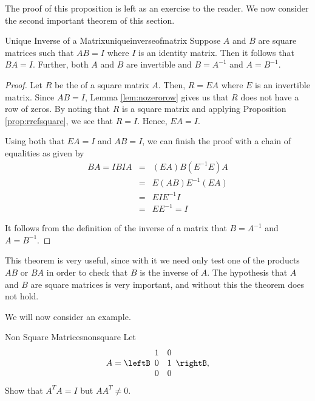 The proof of this proposition is left as an exercise to the reader. 
We now consider the second important theorem of this section. 

\begin{theorem}{Unique Inverse of a Matrix}{uniqueinverseofmatrix}
Suppose $A$ and $B$ are square matrices such that $AB=I$ where $I$ is an identity matrix. Then it follows that $BA=I$. Further, both $A$ and $B$ are invertible and $B=A^{-1}$ and $A=B^{-1}$.
\end{theorem}

\ifdefined\showproofs
\begin{proof}
Let $R$ be the \rref \;of a square matrix $A$. Then, $R=EA$ where $E$ is an invertible matrix. Since $AB=I$, Lemma \ref{lem:nozerorow} gives us that $R$ does not have a row of zeros. By noting that $R$ is a square matrix and applying Proposition \ref{prop:rrefsquare}, we see that $R=I$. Hence, $EA=I$. 

Using both that $EA=I$ and $AB=I$, we can finish the proof with a chain of equalities as given by
\begin{eqnarray*}
BA = IBIA &=& (EA)B(E^{-1}E)A \\
&=& E(AB)E^{-1}(EA) \\
&=& EIE^{-1}I \\
&=& EE^{-1} = I
\end{eqnarray*}

It follows from the definition of the inverse of a matrix that $B=A^{-1}$ and $A=B^{-1}$.
\end{proof}
\fi

This theorem is very useful, since with it we need only test one of the products $AB$ or $BA$ in order to check that $B$ is the inverse of $A$. The hypothesis that $A$ and $B$ are square matrices is very important, and without this the theorem does not hold.

We will now consider an example.

\begin{example}{Non Square Matrices}{nonsquare}
Let 
\begin{equation*}
A =
\leftB
\begin{array}{rr}
1 & 0 \\
0 & 1 \\
0 & 0 
\end{array}
\rightB,
\end{equation*}
Show that $A^{T}A = I$ but $AA^{T} \neq 0$. 
\end{example}

